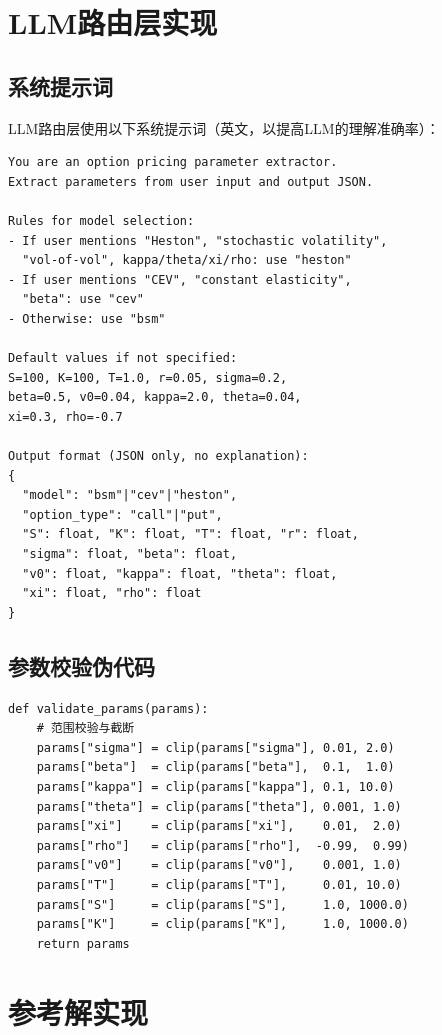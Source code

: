 \section{LLM路由层实现}

\subsection{系统提示词}

LLM路由层使用以下系统提示词（英文，以提高LLM的理解准确率）：

\begin{verbatim}
You are an option pricing parameter extractor.
Extract parameters from user input and output JSON.

Rules for model selection:
- If user mentions "Heston", "stochastic volatility",
  "vol-of-vol", kappa/theta/xi/rho: use "heston"
- If user mentions "CEV", "constant elasticity",
  "beta": use "cev"
- Otherwise: use "bsm"

Default values if not specified:
S=100, K=100, T=1.0, r=0.05, sigma=0.2,
beta=0.5, v0=0.04, kappa=2.0, theta=0.04,
xi=0.3, rho=-0.7

Output format (JSON only, no explanation):
{
  "model": "bsm"|"cev"|"heston",
  "option_type": "call"|"put",
  "S": float, "K": float, "T": float, "r": float,
  "sigma": float, "beta": float,
  "v0": float, "kappa": float, "theta": float,
  "xi": float, "rho": float
}
\end{verbatim}

\subsection{参数校验伪代码}

\begin{verbatim}
def validate_params(params):
    # 范围校验与截断
    params["sigma"] = clip(params["sigma"], 0.01, 2.0)
    params["beta"]  = clip(params["beta"],  0.1,  1.0)
    params["kappa"] = clip(params["kappa"], 0.1, 10.0)
    params["theta"] = clip(params["theta"], 0.001, 1.0)
    params["xi"]    = clip(params["xi"],    0.01,  2.0)
    params["rho"]   = clip(params["rho"],  -0.99,  0.99)
    params["v0"]    = clip(params["v0"],    0.001, 1.0)
    params["T"]     = clip(params["T"],     0.01, 10.0)
    params["S"]     = clip(params["S"],     1.0, 1000.0)
    params["K"]     = clip(params["K"],     1.0, 1000.0)
    return params
\end{verbatim}

\section{参考解实现}

